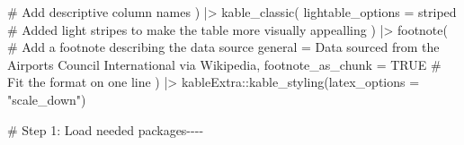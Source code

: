 \documentclass[
  letterpaper,
  DIV=11,
  numbers=noendperiod]{scrartcl}
\newenvironment{Shaded}{\begin{snugshade}}{\end{snugshade}}
\newcommand{\AttributeTok}[1]{\textcolor[rgb]{0.40,0.45,0.13}{#1}}
\newcommand{\CommentTok}[1]{\textcolor[rgb]{0.37,0.37,0.37}{#1}}
\newcommand{\ConstantTok}[1]{\textcolor[rgb]{0.56,0.35,0.01}{#1}}
\newcommand{\FunctionTok}[1]{\textcolor[rgb]{0.28,0.35,0.67}{#1}}
\newcommand{\NormalTok}[1]{\textcolor[rgb]{0.00,0.23,0.31}{#1}}
\newcommand{\SpecialCharTok}[1]{\textcolor[rgb]{0.37,0.37,0.37}{#1}}
\newcommand{\StringTok}[1]{\textcolor[rgb]{0.13,0.47,0.30}{#1}}
\begin{document}
\begin{Shaded}
\begin{Highlighting}[]
    \CommentTok{\# Add descriptive column names}
\NormalTok{  ) }\SpecialCharTok{|\textgreater{}}
  \FunctionTok{kable\_classic}\NormalTok{(}
    \AttributeTok{lightable\_options =} \StringTok{\textquotesingle{}striped\textquotesingle{}} 
    \CommentTok{\# Added light stripes to make the table more visually appealling}
\NormalTok{  ) }\SpecialCharTok{|\textgreater{}}
  \FunctionTok{footnote}\NormalTok{( }\CommentTok{\# Add a footnote describing the data source}
    \AttributeTok{general =} \StringTok{\textquotesingle{}Data sourced from the Airports Council International via Wikipedia\textquotesingle{}}\NormalTok{,}
    \AttributeTok{footnote\_as\_chunk =} \ConstantTok{TRUE} \CommentTok{\# Fit the format on one line}
\NormalTok{  ) }\SpecialCharTok{|\textgreater{}}
\NormalTok{    kableExtra}\SpecialCharTok{::}\FunctionTok{kable\_styling}\NormalTok{(}\AttributeTok{latex\_options =} \StringTok{"scale\_down"}\NormalTok{)}

\CommentTok{\# Step 1: Load needed packages{-}{-}{-}{-}}


\end{Highlighting}
\end{Shaded}
\end{document}
